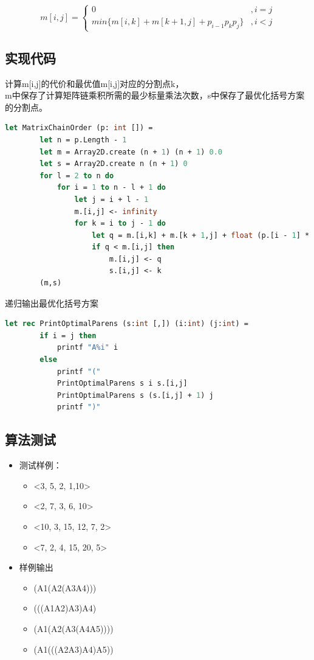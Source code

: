 \documentclass[a4paper]{article}
\begin{document}
\[m[i,j]=
    \left\{
        \begin{array}{ll}
            0 & ,i=j\\
            min\{ m[i,k]+m[k+1,j]+p_{i-1}p_{k}p_{j} \} & ,i<j
        \end{array}
    \right.
\]

\subsection{实现代码}

计算m[i,j]的代价和最优值m[i,j]对应的分割点k，\\
m中保存了计算矩阵链乘积所需的最少标量乘法次数，s中保存了最优化括号方案的分割点。

\begin{lstlisting}[language=ML]
    let MatrixChainOrder (p: int []) =
        let n = p.Length - 1
        let m = Array2D.create (n + 1) (n + 1) 0.0
        let s = Array2D.create n (n + 1) 0
        for l = 2 to n do
            for i = 1 to n - l + 1 do 
                let j = i + l - 1
                m.[i,j] <- infinity
                for k = i to j - 1 do
                    let q = m.[i,k] + m.[k + 1,j] + float (p.[i - 1] * p.[k] * p.[j])
                    if q < m.[i,j] then
                        m.[i,j] <- q
                        s.[i,j] <- k
        (m,s)
\end{lstlisting}

递归输出最优化括号方案

\begin{lstlisting}[language=ML]
    let rec PrintOptimalParens (s:int [,]) (i:int) (j:int) =
        if i = j then 
            printf "A%i" i
        else 
            printf "("
            PrintOptimalParens s i s.[i,j]
            PrintOptimalParens s (s.[i,j] + 1) j
            printf ")"
\end{lstlisting}

\subsection{算法测试}

\begin{itemize}
\item
    测试样例：
    \begin{itemize}
    \item
        <3, 5, 2, 1,10>
    \item
        <2, 7, 3, 6, 10>
    \item
        <10, 3, 15, 12, 7, 2>
    \item
        <7, 2, 4, 15, 20, 5>
    \end{itemize}
\item
    样例输出
    \begin{itemize}
    \item
        (A1(A2(A3A4)))
    \item
        (((A1A2)A3)A4)
    \item
        (A1(A2(A3(A4A5))))
    \item
        (A1(((A2A3)A4)A5))
    \end{itemize}
\end{itemize}
\end{document}
